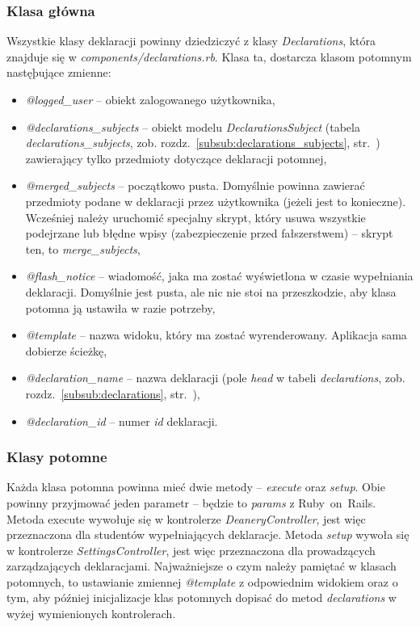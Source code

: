 \documentclass[a4paper,12pt,oneside]{report}
\begin{document}
\subsubsection{Klasa główna}
Wszystkie klasy deklaracji powinny dziedziczyć z klasy \emph{Declarations}, która znajduje się w \emph{components/declarations.rb}. Klasa ta, dostarcza klasom potomnym nastęþujące zmienne:
\begin{itemize}
  \item \emph{@logged\_user} -- obiekt zalogowanego użytkownika,
  \item \emph{@declarations\_subjects} -- obiekt modelu \emph{DeclarationsSubject} (tabela \emph{declarations\_subjects}, zob. rozdz.~\ref{subsub:declarations_subjects}, str.~\pageref{subsub:declarations_subjects}) zawierający tylko przedmioty dotyczące deklaracji potomnej,
  \item \emph{@merged\_subjects} -- początkowo pusta. Domyślnie powinna zawierać przedmioty podane w deklaracji przez użytkownika (jeżeli jest to konieczne). Wcześniej należy uruchomić specjalny skrypt, który usuwa wszystkie podejrzane lub błędne wpisy (zabezpieczenie przed fałszerstwem) -- skrypt ten, to \emph{merge\_subjects},
  \item \emph{@flash\_notice} -- wiadomość, jaka ma zostać wyświetlona w czasie wypełniania deklaracji. Domyślnie jest pusta, ale nic nie stoi na przeszkodzie, aby klasa potomna ją ustawiła w razie potrzeby,
  \item \emph{@template} -- nazwa widoku, który ma zostać wyrenderowany. Aplikacja sama dobierze ścieżkę,
  \item \emph{@declaration\_name} -- nazwa deklaracji (pole \emph{head} w tabeli \emph{declarations}, zob. rozdz.~\ref{subsub:declarations}, str.~\pageref{subsub:declarations}),
  \item \emph{@declaration\_id} -- numer \emph{id} deklaracji.
\end{itemize}

\subsubsection{Klasy potomne}
Każda klasa potomna powinna mieć dwie metody -- \emph{execute} oraz \emph{setup}. Obie powinny przyjmować jeden parametr -- będzie to \emph{params} z Ruby~on~Rails. Metoda execute wywołuje się w kontrolerze \emph{DeaneryController}, jest więc przeznaczona dla studentów wypełniających deklaracje. Metoda \emph{setup} wywoła się w kontrolerze \emph{SettingsController}, jest więc przeznaczona dla prowadzących zarządzających deklaracjami. Najważniejsze o czym należy pamiętać w klasach potomnych, to ustawianie zmiennej \emph{@template} z odpowiednim widokiem oraz o tym, aby później inicjalizacje klas potomnych dopisać do metod \emph{declarations} w wyżej wymienionych kontrolerach.
\end{document}
